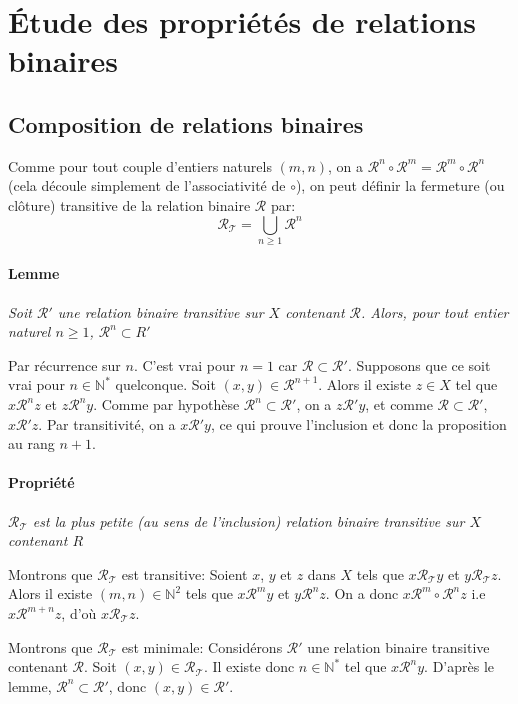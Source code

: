 \documentclass{scrartcl}
\begin{document}
	\section{Étude des propriétés de relations binaires}
		\subsection{Composition de relations binaires}
			Comme pour tout couple d'entiers naturels $(m,n)$, 
			on a $\mathcal{R}^n\circ\mathcal{R}^m = \mathcal{R}^m\circ\mathcal{R}^n$ (cela découle simplement de l'associativité de $\circ$), 
			on peut définir la fermeture (ou clôture) transitive de la relation binaire $\mathcal{R}$ par:
			\[
				\mathcal{R_T} = \bigcup\limits_{n\geq 1} \mathcal{R}^n
			\]
		
			\paragraph{Lemme} \textsl{Soit $\mathcal{R}'$ une relation binaire transitive sur $X$ contenant $\mathcal{R}$. 
			Alors, pour tout entier naturel $n \geq 1$, $\mathcal{R}^n \subset R'$}	
			\begin{demo}
				\item Par récurrence sur $n$. 
				C'est vrai pour $n=1$ car $\mathcal{R}\subset\mathcal{R}'$.
				Supposons que ce soit vrai pour $n\in\mathbb{N}^*$ quelconque.
				Soit $(x,y)\in \mathcal{R}^{n+1}$. 
				Alors il existe $z \in X$ tel que $x\mathcal{R}^nz$ et $z\mathcal{R}^ny$.
				Comme par hypothèse $\mathcal{R}^n \subset \mathcal{R}'$, on a $z\mathcal{R}'y$, 
				et comme $\mathcal{R} \subset \mathcal{R}'$, $x\mathcal{R}'z$. Par transitivité, on a $x\mathcal{R}'y$,
				ce qui prouve l'inclusion et donc la proposition au rang $n+1$.
			\end{demo}

			\paragraph{Propriété} \textsl{$\mathcal{R_T}$ est la plus petite (au sens de l'inclusion) relation binaire transitive sur $X$ contenant $R$}
			\begin{demo}
				\item Montrons que $\mathcal{R_T}$ est transitive:
				Soient $x$, $y$ et $z$ dans $X$ tels que $x\mathcal{R_T}y$ et $y\mathcal{R_T}z$.
				Alors il existe $(m,n)\in\mathbb{N}^2$ tels que $x\mathcal{R}^my$ et $y\mathcal{R}^nz$.
				On a donc $x\mathcal{R}^m\circ\mathcal{R}^nz$ i.e $x\mathcal{R}^{m+n}z$, d'où $x\mathcal{R_T}z$.
				\item Montrons que $\mathcal{R_T}$ est minimale:
				Considérons $\mathcal{R}'$ une relation binaire transitive contenant $\mathcal{R}$. Soit $(x,y) \in \mathcal{R_T}$.
				Il existe donc $n\in\mathbb{N}^*$ tel que $x\mathcal{R}^ny$. D'après le lemme, $\mathcal{R}^n\subset\mathcal{R}'$,
				donc $(x,y)\in\mathcal{R}'$.
			\end{demo}
\end{document}
